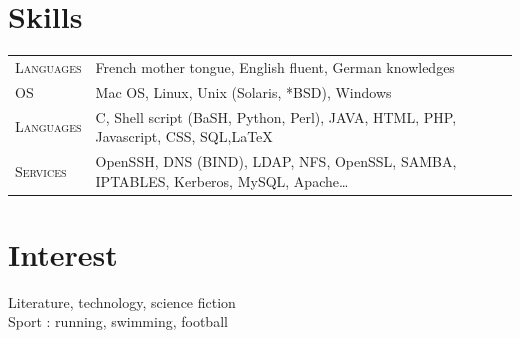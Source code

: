\documentclass[a4paper,10pt]{article}
\begin{document}
\section{Skills}
\begin{tabular}{p{}|p{}}	
\textsc{Languages} & French mother tongue, English fluent, German knowledges\\
\textsc{OS} & Mac OS, Linux, Unix (Solaris, *BSD), Windows\\
\textsc{Languages} & C, Shell script (BaSH, Python, Perl), JAVA, HTML, PHP, Javascript, CSS, SQL,\LaTeX\\
\textsc{Services} & OpenSSH, DNS (BIND), LDAP, NFS, OpenSSL, SAMBA, IPTABLES, Kerberos, MySQL, Apache\ldots
\end{tabular}


\section{Interest}

\par Literature, technology, science fiction\\
Sport : running, swimming, football\\


\end{document}
